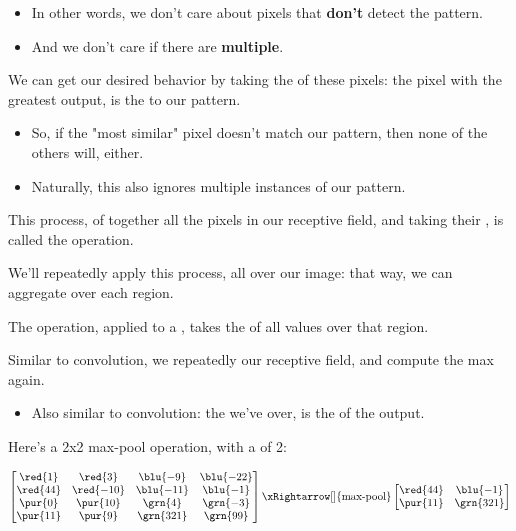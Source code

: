         \begin{itemize}
            \item In other words, we don't care about pixels that \textbf{don't} detect the pattern.
            \item And we don't care if there are \textbf{multiple}.
        \end{itemize}

        We can get our desired behavior by taking the  of these pixels: the pixel with the greatest output, is the  to our pattern.

        \begin{itemize}
            \item So, if the "most similar" pixel doesn't match our pattern, then none of the others will, either. 
            \item Naturally, this also ignores multiple instances of our pattern.
        \end{itemize}

        This process, of  together all the pixels in our receptive field, and taking their , is called the  operation.

        We'll repeatedly apply this process, all over our image: that way, we can aggregate over each region.\\

        \begin{definition}
            The  operation, applied to a , takes the  of all values over that region.

            Similar to convolution, we repeatedly  our receptive field, and compute the max again.
            
            \begin{itemize}
                \item Also similar to convolution: the  we've  over, is the  of the output.
            \end{itemize}
        \end{definition}

        \miniex Here's a 2x2 max-pool operation, with a  of 2:

        \begin{equation}
            \begin{bmatrix}
                \red{1} & \red{3} & \blu{-9} & \blu{-22} \\
                \red{44} & \red{-10} & \blu{-11} & \blu{-1} \\
                \pur{0} & \pur{10} & \grn{4} & \grn{-3} \\
                \pur{11} & \pur{9} & \grn{321} & \grn{99}
            \end{bmatrix}
            \xRightarrow[]{\text{max-pool}}
            \begin{bmatrix}
                \red{44} & \blu{-1} \\
                \pur{11} & \grn{321}
            \end{bmatrix}
        \end{equation}

